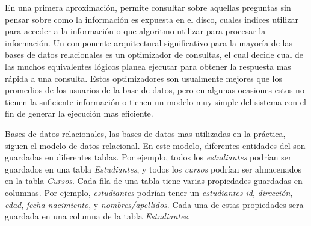 En una primera aproximación, \sqlNAME permite consultar sobre aquellas preguntas sin pensar sobre como la información es expuesta en el disco, cuales indices utilizar para acceder a la información o que algoritmo utilizar para procesar la información. Un componente arquitectural significativo para la mayoría de las bases de datos relacionales es un optimizador de consultas, el cual decide cual de las muchos equivalentes lógicos planea ejecutar para obtener la respuesta mas rápida a una consulta. Estos optimizadores son usualmente mejores que los promedios de los usuarios de la base de datos, pero en algunas ocasiones estos no tienen la suficiente información o tienen un modelo muy simple del sistema con el fin de generar la ejecución mas eficiente.

Bases de datos relacionales, las bases de datos mas utilizadas en la práctica, siguen el modelo de datos relacional. En este modelo, diferentes entidades del \realWorld son guardadas en diferentes tablas. Por ejemplo, todos los \textit{estudiantes} podrían ser guardados en una tabla \textit{Estudiantes}, y todos los \textit{cursos} podrían ser almacenados en la tabla \textit{Cursos}. Cada fila de una tabla tiene varias propiedades guardadas en columnas. Por ejemplo, \textit{estudiantes} podrían tener un \textit{estudiantes id}, \textit{dirección}, \textit{edad},  \textit{fecha nacimiento}, y \textit{nombres/apellidos}. Cada una de estas propiedades sera guardada en una columna de la tabla \textit{Estudiantes}.


